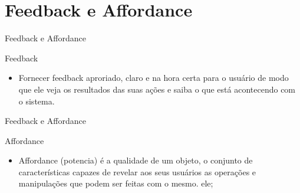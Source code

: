 \section{Feedback e Affordance}

\begin{frame}{Feedback e Affordance}{}
\begin{block}{Feedback}
  \begin{itemize}
    \item<1-> Fornecer feedback aproriado, claro e na hora certa para o usuário de modo que ele veja os resultados das suas ações e saiba o que está acontecendo com o sistema.
  \end{itemize}
\end{block}
\end{frame}

\begin{frame}{Feedback e Affordance}
\begin{block}{Affordance}
  \begin{itemize}
    \item<1-> Affordance (potencia) é a qualidade de um objeto, o conjunto de características capazes de revelar aos seus usuários as operações e manipulações que podem ser feitas com o mesmo.
ele;
  \end{itemize}
\end{block}
\end{frame}

